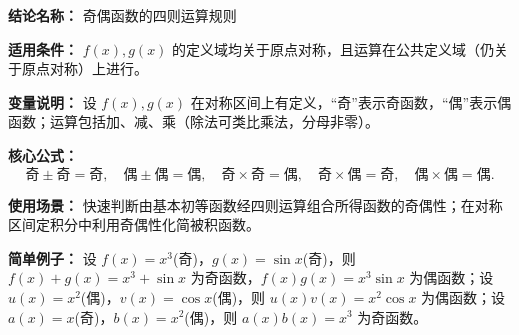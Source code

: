 \textbf{结论名称：} 奇偶函数的四则运算规则

\textbf{适用条件：} \(f(x), g(x)\) 的定义域均关于原点对称，且运算在公共定义域（仍关于原点对称）上进行。

\textbf{变量说明：} 设 \(f(x), g(x)\) 在对称区间上有定义，“奇”表示奇函数，“偶”表示偶函数；运算包括加、减、乘（除法可类比乘法，分母非零）。

\textbf{核心公式：}
\[
\boxed{\text{奇}\pm\text{奇}=\text{奇},\quad \text{偶}\pm\text{偶}=\text{偶},\quad \text{奇}\times\text{奇}=\text{偶},\quad \text{奇}\times\text{偶}=\text{奇},\quad \text{偶}\times\text{偶}=\text{偶}.}
\]

\textbf{使用场景：} 快速判断由基本初等函数经四则运算组合所得函数的奇偶性；在对称区间定积分中利用奇偶性化简被积函数。

\textbf{简单例子：} 设 \(f(x)=x^3\)(奇)，\(g(x)=\sin x\)(奇)，则 \(f(x)+g(x)=x^3+\sin x\) 为奇函数，\(f(x)g(x)=x^3\sin x\) 为偶函数；设 \(u(x)=x^2\)(偶)，\(v(x)=\cos x\)(偶)，则 \(u(x)v(x)=x^2\cos x\) 为偶函数；设 \(a(x)=x\)(奇)，\(b(x)=x^2\)(偶)，则 \(a(x)b(x)=x^3\) 为奇函数。